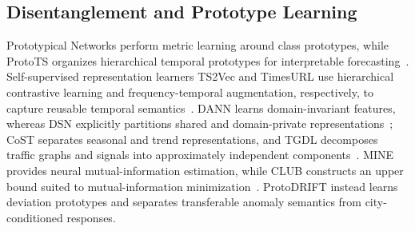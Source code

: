 \subsection{Disentanglement and Prototype Learning}
Prototypical Networks perform metric learning around class prototypes, while ProtoTS organizes hierarchical temporal prototypes for interpretable forecasting~\cite{protonet,protots}. Self-supervised representation learners TS2Vec and TimesURL use hierarchical contrastive learning and frequency-temporal augmentation, respectively, to capture reusable temporal semantics~\cite{TS2Vec,TimesURL}. DANN learns domain-invariant features, whereas DSN explicitly partitions shared and domain-private representations~\cite{dann,dsn}; CoST separates seasonal and trend representations, and TGDL decomposes traffic graphs and signals into approximately independent components~\cite{cost,tgdl}. MINE provides neural mutual-information estimation, while CLUB constructs an upper bound suited to mutual-information minimization~\cite{mine,club}. ProtoDRIFT instead learns deviation prototypes and separates transferable anomaly semantics from city-conditioned responses.
